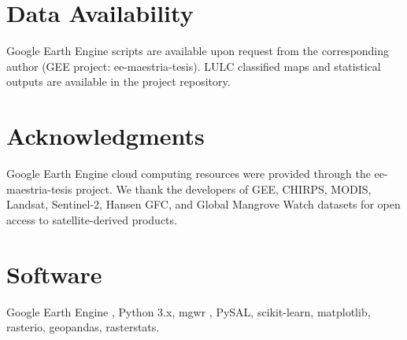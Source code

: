 \documentclass[12pt,a4paper]{article}
\begin{document}
\section*{Data Availability}
Google Earth Engine scripts are available upon request from the corresponding author (GEE project: ee-maestria-tesis). LULC classified maps and statistical outputs are available in the project repository.

\section*{Acknowledgments}
Google Earth Engine cloud computing resources were provided through the ee-maestria-tesis project. We thank the developers of GEE, CHIRPS, MODIS, Landsat, Sentinel-2, Hansen GFC, and Global Mangrove Watch datasets for open access to satellite-derived products.

\section*{Software}
Google Earth Engine \citep{Gorelick2017}, Python 3.x,
mgwr \citep{Oshan2019}, PySAL, scikit-learn, matplotlib, rasterio,
geopandas, rasterstats.

\printbibliography
\end{document}
